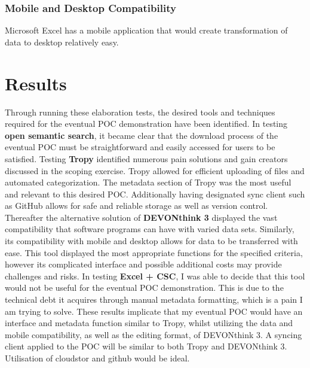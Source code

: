 \documentclass{article}
\begin{document}
\subsubsection{Mobile and Desktop Compatibility}
Microsoft Excel has a mobile application that would create transformation of data to desktop relatively easy.

\section{Results}
Through running these elaboration tests, the desired tools and techniques required for the eventual POC demonstration have been identified. In testing \textbf{open semantic search}, it became clear that the download process of the eventual POC must be straightforward and easily accessed for users to be satisfied. Testing \textbf{Tropy} identified numerous pain solutions and gain creators discussed in the scoping exercise. Tropy allowed for efficient uploading of files and automated categorization. The metadata section of Tropy was the most useful and relevant to this desired POC. Additionally having designated sync client such as GitHub allows for safe and reliable storage as well as version control. Thereafter the alternative solution of \textbf{DEVONthink 3} displayed the vast compatibility that software programs can have with varied data sets. Similarly, its compatibility with mobile and desktop allows for data to be transferred with ease. This tool displayed the most appropriate functions for the specified criteria, however its complicated interface and possible additional costs may provide challenges and risks. In testing \textbf{Excel + CSC}, I was able to decide that this tool would not be useful for the eventual POC demonstration. This is due to the technical debt it acquires through manual metadata formatting, which is a pain I am trying to solve. These results implicate that my eventual POC would have an interface and metadata function similar to Tropy, whilst utilizing the data and mobile compatibility, as well as the editing format, of DEVONthink 3. A syncing client applied to the POC will be similar to both Tropy and DEVONthink 3. Utilisation of cloudstor and github would be ideal.
\end{document}

